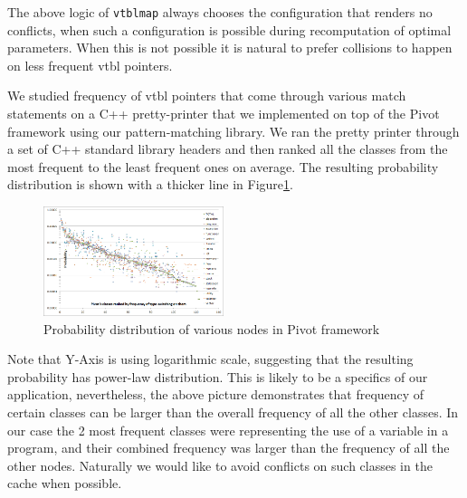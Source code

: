 \documentclass[preprint]{sigplanconf}
\makeatletter
\DeclareRobustCommand{\code}[1]{{\lstinline[breaklines=false,escapechar=@]{#1}}}
\makeatother
\begin{document}
The above logic of \code{vtblmap} always chooses the configuration that renders 
no conflicts, when such a configuration is possible during recomputation of 
optimal parameters. When this is not possible it is natural to prefer collisions 
to happen on less frequent vtbl pointers.

We studied frequency of vtbl pointers that come through various match statements 
on a C++ pretty-printer that we implemented on top of the Pivot 
framework\cite{Pivot09} using our pattern-matching library. We ran the pretty 
printer through a set of C++ standard library headers and then ranked all the 
classes from the most frequent to the least frequent ones on average. The 
resulting probability distribution is shown with a thicker line in 
Figure\ref{fig:PowerLaw}.

\begin{figure}[htbp]
  \centering
    \includegraphics[width=0.47\textwidth]{std-lib-power-law-distributions.png}
  \caption{Probability distribution of various nodes in Pivot framework}
  \label{fig:PowerLaw}
\end{figure}

Note that Y-Axis is using logarithmic scale, suggesting that the resulting 
probability has power-law distribution. This is likely to be a specifics of our 
application, nevertheless, the above picture demonstrates that frequency of certain 
classes can be larger than the overall frequency of all the other classes. In 
our case the 2 most frequent classes were representing the use of a variable in 
a program, and their combined frequency was larger than the frequency of all the 
other nodes. Naturally we would like to avoid conflicts on such classes in the 
cache when possible.
\end{document}
